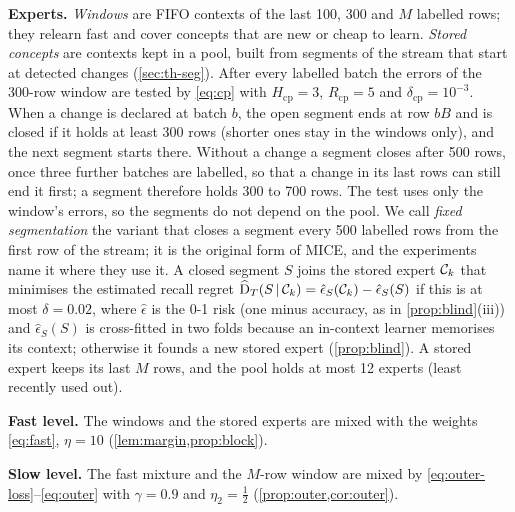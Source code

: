 \documentclass[11pt]{article}
\theoremstyle{plain}
\theoremstyle{definition}
\theoremstyle{remark}
\newcommand{\method}{\textsc{MICE}}   %
\begin{document}
\textbf{Experts.} \emph{Windows} are FIFO contexts of the last 100, 300 and $M$ labelled rows; they relearn fast and
cover concepts that are new or cheap to learn. \emph{Stored concepts} are contexts kept in a pool, built from
segments of the stream that start at detected changes (\cref{sec:th-seg}). After every labelled batch the errors of
the 300-row window are tested by \eqref{eq:cp} with $H_{\mathrm{cp}}=3$, $R_{\mathrm{cp}}=5$ and
$\delta_{\mathrm{cp}}=10^{-3}$. When a change is declared at batch $b$, the open segment ends at row $bB$ and is
closed if it holds at least 300 rows (shorter ones stay in the windows only), and the next segment starts there.
Without a change a segment closes after 500 rows, once three further batches are labelled, so that a change in its
last rows can still end it first; a segment therefore holds 300 to 700 rows. The test uses only the window's errors, so the segments do not depend on the pool.
We call \emph{fixed segmentation} the variant that closes a segment every 500 labelled rows from the first row of the
stream; it is the original form of \method{}, and the experiments name it where they use it. A closed segment $S$ joins the stored expert $\mathcal{C}_k$ that minimises the estimated recall regret
$\widehat{\mathrm{D}}_T(S\,|\,\mathcal{C}_k)=\hat\epsilon_S(\mathcal{C}_k)-\hat\epsilon_S(S)$ if this is at most $\delta=0.02$, where
$\hat\epsilon$ is the 0-1 risk (one minus accuracy, as in \cref{prop:blind}(iii)) and $\hat\epsilon_S(S)$ is
cross-fitted in two folds because an in-context learner memorises its context; otherwise it
founds a new stored expert (\cref{prop:blind}). A stored expert keeps its last $M$ rows, and the pool holds at most
12 experts (least recently used out).

\textbf{Fast level.} The windows and the stored experts are mixed with the weights \eqref{eq:fast}, $\eta=10$
(\cref{lem:margin,prop:block}).

\textbf{Slow level.} The fast mixture and the $M$-row window are mixed by \eqref{eq:outer-loss}--\eqref{eq:outer}
with $\gamma=0.9$ and $\eta_2=\tfrac12$ (\cref{prop:outer,cor:outer}).
\end{document}
